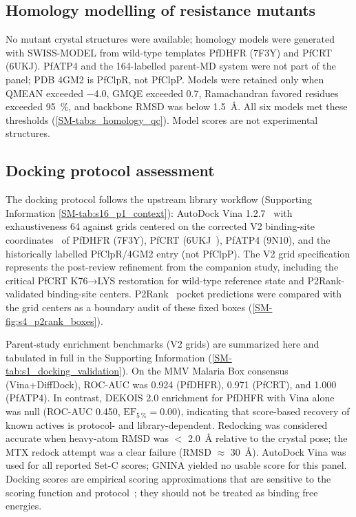 \documentclass[journal=jcisd8,manuscript=article,layout=traditional]{achemso}
\begin{document}
\subsection{Homology modelling of resistance mutants}

No mutant crystal structures were available; homology models were generated with SWISS-MODEL from wild-type templates PfDHFR (7F3Y) and PfCRT (6UKJ). PfATP4 and the 164-labelled parent-MD system were not part of the panel; PDB 4GM2 is PfClpR, not PfClpP. Models were retained only when QMEAN exceeded \num{-4.0}, GMQE exceeded \num{0.7}, Ramachandran favored residues exceeded \qty{95}{\percent}, and backbone RMSD was below \qty{1.5}{\angstrom}. All six models met these thresholds (\cref{SM-tab:s_homology_qc}). Model scores are not experimental structures.

\subsection{Docking protocol assessment}

The docking protocol follows the upstream library workflow (Supporting Information \cref{SM-tab:s16_p1_context}): AutoDock Vina 1.2.7~\citep{vina_2021} with exhaustiveness \num{64} against grids centered on the corrected V2 binding-site coordinates~\citep{Temgoua2026} of PfDHFR (7F3Y), PfCRT (6UKJ~\citep{Kim2019PfCRT}), PfATP4 (9N10), and the historically labelled PfClpR/4GM2 entry (not PfClpP). The V2 grid specification represents the post-review refinement from the companion study, including the critical PfCRT K76→LYS restoration for wild-type reference state and P2Rank-validated binding-site centers. P2Rank~\citep{Krivak2018P2Rank} pocket predictions were compared with the grid centers as a boundary audit of these fixed boxes (\cref{SM-fig:s4_p2rank_boxes}).

Parent-study enrichment benchmarks (V2 grids) are summarized here and tabulated in full in the Supporting Information (\cref{SM-tab:s1_docking_validation}). On the MMV Malaria Box consensus (Vina+DiffDock), ROC-AUC was \num{0.924} (PfDHFR), \num{0.971} (PfCRT), and \num{1.000} (PfATP4). In contrast, DEKOIS 2.0 enrichment for PfDHFR with Vina alone was null (ROC-AUC \num{0.450}, $\mathrm{EF}_{5\,\%} = \num{0.00}$), indicating that score-based recovery of known actives is protocol- and library-dependent. Redocking was considered accurate when heavy-atom RMSD was $<$ \qty{2.0}{\angstrom} relative to the crystal pose; the MTX redock attempt was a clear failure (RMSD $\approx$ \qty{30}{\angstrom}). AutoDock Vina was used for all reported Set-C scores; GNINA yielded no usable score for this panel. Docking scores are empirical scoring approximations that are sensitive to the scoring function and protocol~\citep{ferreira2023docking,sadybekov2023computational,kittelson2026docking}; they should not be treated as binding free energies.
\end{document}
